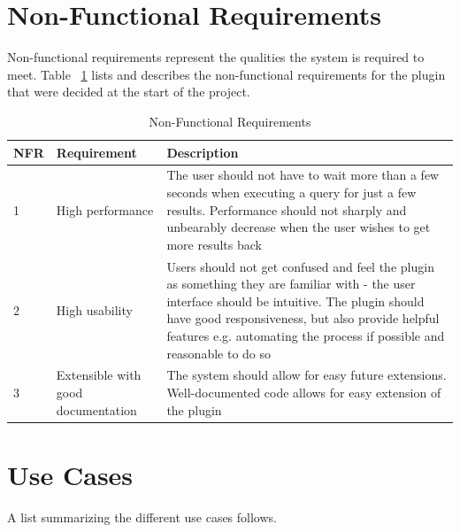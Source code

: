 \documentclass{l4proj}
\begin{document}
\section{Non-Functional Requirements}
Non-functional requirements represent the qualities the system is required to meet. Table ~\ref{table:nonFuncTable}  lists and describes the non-functional requirements for the plugin that were decided at the start of the project.
\begin{table}[H]
\caption{Non-Functional Requirements}
\centering
\def\arraystretch{1.5}
\begin{tabular}{p{2cm}p{4cm}p{9cm}}
\hline
NFR & Requirement & Description \\
\hline
1 & High performance & The user should not have to wait more than a few seconds when executing a query for just a few results. Performance should not sharply and unbearably decrease when the user wishes to get more results back \\
2 & High usability & Users should not get confused and feel the plugin as something they are familiar with - the user interface should be intuitive. The plugin should have good responsiveness, but also provide helpful features e.g. automating the process if possible and reasonable to do so \\
3 & Extensible with good documentation& The system should allow for easy future extensions. Well-documented code allows for easy extension of the plugin\\
\hline
\end{tabular}
\label{table:nonFuncTable}
\end{table}

\section{Use Cases}
A list summarizing the different use cases follows.
\end{document}
